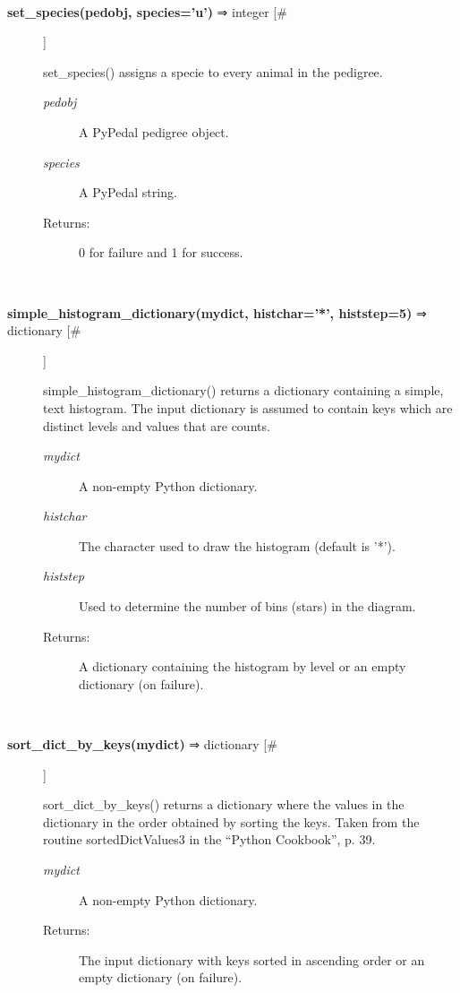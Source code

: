 \documentclass[10pt]{article}
\begin{document}
\begin{description}
\begin{description}
\end{description}
\\ 

\item[\textbf{set\_species(pedobj, species='u')}
 ⇒ integer [\#]]

 set\_species() assigns a specie to every animal in the pedigree.
\begin{description}
\item[\emph{pedobj}
] A PyPedal pedigree object.
\item[\emph{species}
] A PyPedal string.
\item[Returns:] 0 for failure and 1 for success.

\end{description}
\\ 

\item[\textbf{simple\_histogram\_dictionary(mydict, histchar='*', histstep=5)}
 ⇒ dictionary [\#]]

 simple\_histogram\_dictionary() returns a dictionary containing a simple, text histogram. The input dictionary is assumed to contain keys which are distinct levels and values that are counts.
\begin{description}
\item[\emph{mydict}
] A non-empty Python dictionary.
\item[\emph{histchar}
] The character used to draw the histogram (default is '*').
\item[\emph{histstep}
] Used to determine the number of bins (stars) in the diagram.
\item[Returns:] A dictionary containing the histogram by level or an empty dictionary (on failure).

\end{description}
\\ 

\item[\textbf{sort\_dict\_by\_keys(mydict)}
 ⇒ dictionary [\#]]

 sort\_dict\_by\_keys() returns a dictionary where the values in the dictionary in the order obtained by sorting the keys. Taken from the routine sortedDictValues3 in the ``Python Cookbook'', p. 39.
\begin{description}
\item[\emph{mydict}
] A non-empty Python dictionary.
\item[Returns:] The input dictionary with keys sorted in ascending order or an empty dictionary (on failure).


\end{description}
\end{description}
\end{document}

